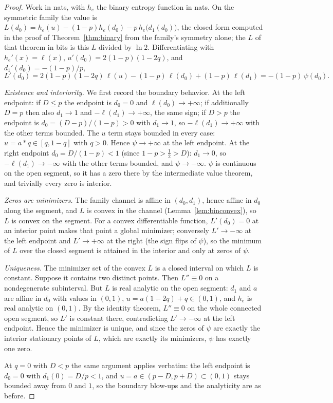\documentclass[11pt,onecolumn]{IEEEtran}
\begin{document}
\begin{proof}
Work in nats, with $h_e$ the binary entropy function in nats. On the
symmetric family the value is
$L(d_0)=h_e(u)-(1-p)h_e(d_0)-p\,h_e\bigl(d_1(d_0)\bigr)$, the closed form
computed in the proof of Theorem~\ref{thm:binary} from the family's
symmetry alone; the $L$ of that theorem in bits is this $L$ divided by
$\ln2$. Differentiating
with $h_e'(x)=\ell(x)$, $u'(d_0)=2(1-p)(1-2q)$, and $d_1'(d_0)=-(1-p)/p$,
\[
L'(d_0)=2(1-p)(1-2q)\,\ell(u)-(1-p)\,\ell(d_0)+(1-p)\,\ell(d_1)
=-(1-p)\,\psi(d_0).
\]

\emph{Existence and interiority.} We first record the boundary
behavior. At the left
endpoint: if $D\le p$ the endpoint is $d_0=0$ and
$\ell(d_0)\to+\infty$; if additionally $D=p$ then also $d_1\to1$ and
$-\ell(d_1)\to+\infty$, the same sign; if $D>p$ the endpoint is
$d_0=(D-p)/(1-p)>0$ with $d_1\to1$, so $-\ell(d_1)\to+\infty$ with the
other terms bounded. The $u$ term stays bounded in every case:
$u=a*q\in[q,1-q]$ with $q>0$. Hence $\psi\to+\infty$ at the left
endpoint. At the right endpoint $d_0=D/(1-p)<1$ (since $1-p>\tfrac12>D$):
$d_1\to0$, so $-\ell(d_1)\to-\infty$ with the other terms bounded, and
$\psi\to-\infty$. $\psi$ is continuous on the open segment, so it has a
zero there by the intermediate value theorem, and trivially every zero
is interior.

\emph{Zeros are minimizers.} The family channel is affine in
$(d_0,d_1)$, hence affine in $d_0$ along the segment, and
$L$ is convex in the channel (Lemma~\ref{lem:binconvex}), so $L$ is
convex on the segment. For
a convex differentiable function, $L'(d_0)=0$ at an interior point
makes that point a global minimizer; conversely
$L'\to-\infty$ at the left endpoint and $L'\to+\infty$ at the right
(the sign flips of $\psi$), so the minimum of $L$ over the closed
segment is attained in the interior and only at zeros of $\psi$.

\emph{Uniqueness.} The minimizer set of the convex $L$ is a closed
interval on which $L$ is constant. Suppose it contains two distinct
points. Then $L''\equiv0$ on a nondegenerate subinterval. But $L$ is
real analytic on the open segment: $d_1$ and $a$ are affine in $d_0$
with values in $(0,1)$, $u=a(1-2q)+q\in(0,1)$, and $h_e$ is real analytic
on $(0,1)$. By the identity theorem, $L''\equiv0$ on the whole
connected open segment, so $L'$ is constant there, contradicting
$L'\to-\infty$ at the left endpoint. Hence the minimizer is unique, and
since the zeros of $\psi$ are exactly the interior stationary points of
$L$, which are exactly its minimizers, $\psi$ has exactly one zero.

At $q=0$ with $D<p$ the same argument applies verbatim: the left
endpoint is $d_0=0$ with $d_1(0)=D/p<1$, and $u=a\in(p-D,p+D)\subset
(0,1)$ stays bounded away from $0$ and $1$, so the boundary blow-ups
and the analyticity are as before.
\end{proof}
\end{document}
